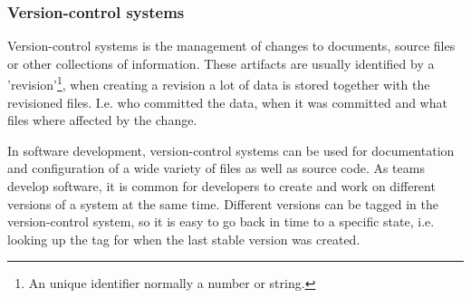 \subsubsection{Version-control systems}
Version-control systems is the management of changes to documents, source files or other collections of information. These artifacts are usually identified by a 'revision'\footnote{An unique identifier normally a number or string.}, when creating a revision a lot of data is stored together with the revisioned files. I.e. who committed the data, when it was committed and what files where affected by the change.

In software development, version-control systems can be used for documentation and configuration of a wide variety of files as well as source code. As teams develop software, it is common for developers to create and work on different versions of a system at the same time. Different versions can be tagged in the version-control system, so it is easy to go back in time to a specific state, i.e. looking up the tag for when the last stable version was created.



